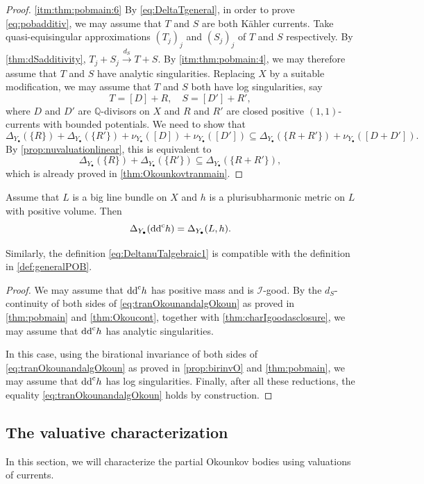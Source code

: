 \begin{proof}
\ref{itm:thm:pobmain:6} By \eqref{eq:DeltaTgeneral}, in order to prove \eqref{eq:pobadditiv}, we may assume that $T$ and $S$ are both Kähler currents. Take quasi-equisingular approximations $(T_j)_j$ and $(S_j)_j$ of $T$ and $S$ respectively. By \cref{thm:dSadditivity}, $T_j+S_j\xrightarrow{d_S} T+S$. By \ref{itm:thm:pobmain:4}, we may therefore assume that $T$ and $S$ have analytic singularities. Replacing $X$ by a suitable modification, we may assume that $T$ and $S$ both have log singularities, say
\[
T=[D]+R,\quad S=[D']+R',
\]
where $D$ and $D'$ are $\mathbb{Q}$-divisors on $X$ and $R$ and $R'$ are closed positive $(1,1)$-currents with bounded potentials. We need to show that
\[
\Delta_{Y_{\bullet}}(\{R\})+\Delta_{Y_{\bullet}}(\{R'\})+\nu_{Y_{\bullet}}([D])+\nu_{Y_{\bullet}}([D'])\subseteq \Delta_{Y_{\bullet}}(\{R+R'\})+\nu_{Y_{\bullet}}([D+D']).
\]
By \cref{prop:nuvaluationlinear}, this is equivalent to
\[
\Delta_{Y_{\bullet}}(\{R\})+\Delta_{Y_{\bullet}}(\{R'\})\subseteq \Delta_{Y_{\bullet}}(\{R+R'\}),
\]
which is already proved in \cref{thm:Okounkovtranmain}.
\end{proof}

\begin{corollary}\label{cor:transalgPOB}
Assume that $L$ is a big line bundle on $X$ and $h$ is a plurisubharmonic metric on $L$ with positive volume. Then
\begin{equation}\label{eq:tranOkounandalgOkoun}
\Delta_{Y_{\bullet}}(\mathrm{dd}^{\mathrm{c}} h)=\Delta_{Y_{\bullet}}(L,h).
\end{equation}
\end{corollary}
Similarly, the definition \eqref{eq:DeltanuTalgebraic1} is compatible with the definition in \cref{def:generalPOB}.
\begin{proof}
    We may assume that $\mathrm{dd}^{\mathrm{c}} h$ has positive mass and is $\mathcal{I}$-good. By the $d_S$-continuity of both sides of \eqref{eq:tranOkounandalgOkoun} as proved in \cref{thm:pobmain} and \cref{thm:Okoucont}, together with \cref{thm:charIgoodasclosure}, we may assume that $\mathrm{dd}^{\mathrm{c}} h$ has analytic singularities.

    In this case, using the birational invariance of both sides of \eqref{eq:tranOkounandalgOkoun} as proved in \cref{prop:birinvO} and \cref{thm:pobmain}, we may assume that $\mathrm{dd}^{\mathrm{c}} h$ has log singularities. Finally, after all these reductions, the equality \eqref{eq:tranOkounandalgOkoun} holds by construction.
\end{proof}



\subsection{The valuative characterization}
\label{subsec:tpob_valuative}
In this section, we will characterize the partial Okounkov bodies using valuations of currents.

